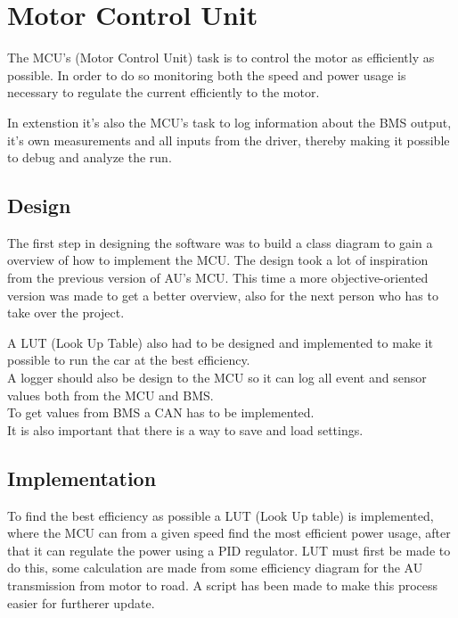 \section{Motor Control Unit}

The MCU's (Motor Control Unit) task is to control the motor as efficiently as possible. In order to do so monitoring both the speed and power usage is necessary to regulate the current efficiently to the motor.

In extenstion it's also the MCU's task to log information about the BMS output, it's own measurements and all inputs from the driver, thereby making it possible to debug and analyze the run. 

\subsection{Design}
The first step in designing the software was to build a class diagram to gain a overview of how to implement the MCU.
The design took a lot of inspiration from the previous version of AU's MCU. This time a more objective-oriented version was made to get a better overview, also for the next person who has to take over the project.

A LUT (Look Up Table) also had to be designed and implemented  to make it possible to run the car at the best efficiency.\\

A logger should also be design to the MCU so it can log all event and sensor values both from the MCU and BMS.\\ 

To get values from BMS a CAN has to be implemented.\\

It is also important that there is a way to save and load settings. 
\subsection{Implementation}

To find the best efficiency as possible a LUT (Look Up table) is implemented, where the MCU can from a given speed find the most efficient power usage, after that it can regulate the power using a PID regulator. LUT must first be made to do this, some calculation are made from some efficiency diagram for the AU transmission from motor to road. A script has been made to make this process easier for furtherer update.\\

